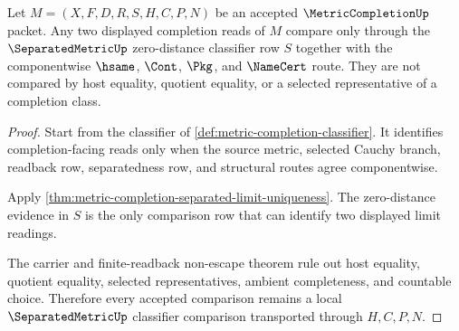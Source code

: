 \begin{theorem}
\label{thm:metric-completion-obligation-separated-comparison}
Let $M=(X,F,D,R,S,H,C,P,N)$ be an accepted $\MetricCompletionUp$ packet. Any two displayed completion reads of $M$ compare only through the $\SeparatedMetricUp$ zero-distance classifier row $S$ together with the componentwise $\hsame$, $\Cont$, $\Pkg$, and $\NameCert$ route. They are not compared by host equality, quotient equality, or a selected representative of a completion class.
\end{theorem}
\begin{proof}
Start from the classifier of \autoref{def:metric-completion-classifier}. It identifies completion-facing reads only when the source metric, selected Cauchy branch, readback row, separatedness row, and structural routes agree componentwise.

Apply \autoref{thm:metric-completion-separated-limit-uniqueness}. The zero-distance evidence in $S$ is the only comparison row that can identify two displayed limit readings.

The carrier and finite-readback non-escape theorem rule out host equality, quotient equality, selected representatives, ambient completeness, and countable choice. Therefore every accepted comparison remains a local $\SeparatedMetricUp$ classifier comparison transported through $H,C,P,N$.
\end{proof}

